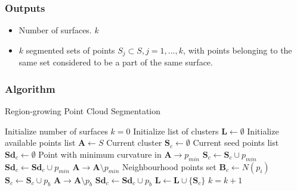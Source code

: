\documentclass[12pt,a4paper]{article}
\begin{document}
    \subsubsection{Outputs}
    \begin{itemize}
        \itemsep0em 
        \item Number of surfaces. $k$
        \item $k$ segmented sets of points $S_j \subset S, j=1,\dots,k$, with points belonging to the same set considered to be a part of the same surface.
    \end{itemize}
    
    \subsubsection{Algorithm}
    \begin{algorithm}[H]
        \caption{Region-growing Point Cloud Segmentation}
        \begin{algorithmic}
            \State Initialize number of surfaces $k = 0$
            \State Initialize list of clusters $\textbf{L} \leftarrow \emptyset$
            \State Initialize available points list $\textbf{A} \leftarrow S$
            \State Current cluster $\textbf{S}_c \leftarrow \emptyset$
            \State Current seed points list $\textbf{Sd}_{c} \leftarrow \emptyset$
            \State Point with minimum curvature in $\textbf{A} \rightarrow p_{min}$
            \State $\textbf{S}_c \leftarrow \textbf{S}_c \cup p_{min}$
            \State $\textbf{Sd}_c \leftarrow \textbf{Sd}_c \cup p_{min}$
            \State $\textbf{A} \rightarrow \textbf{A} \setminus p_{min} $
            \State Neighbourhood points set $\textbf{B}_c \leftarrow N(p_i)$
            \State $\textbf{S}_c \leftarrow \textbf{S}_c \cup p_b$
            \State $\textbf{A} \rightarrow \textbf{A} \setminus p_b $
            \State $\textbf{Sd}_c \leftarrow \textbf{Sd}_c \cup p_b$
            \EndIf
             \EndIf
            \EndFor
            \EndFor
            \State $\textbf{L} \leftarrow \textbf{L} \cup \{\textbf{S}_c\}$
            \State $k = k+1$
            \EndWhile
            
        \end{algorithmic}
    \end{algorithm}
    
\end{document}
